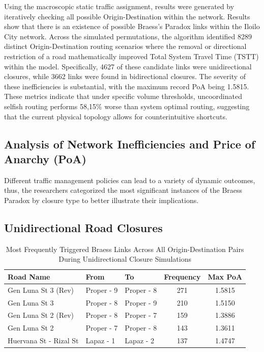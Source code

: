 Using the macroscopic static traffic assignment, results were generated by iteratively checking all possible Origin-Destination within the network. Results show that there is an existence of possible Braess's Paradox links within the Iloilo City network. Across the simulated permutations, the algorithm identified 8289 distinct Origin-Destination routing scenarios where the removal or directional restriction of a road mathematically improved Total System Travel Time (TSTT) within the model. Specifically, 4627 of these candidate links were unidirectional closures, while 3662 links were found in bidirectional closures. The severity of these inefficiencies is substantial, with the maximum record PoA being 1.5815. These metrics indicate that under specific volume thresholds, uncoordinated selfish routing performs 58,15\% worse than system optimal routing, suggesting that the current physical topology allows for counterintuitive shortcuts.

\subsection{Analysis of Network Inefficiencies and Price of Anarchy (PoA)}
\label{sec:network_inefficiencies_PoA}

Different traffic management policies can lead to a variety of dynamic outcomes, thus, the researchers categorized the most significant instances of the Braess Paradox by closure type to better illustrate their implications.

\subsection{Unidirectional Road Closures}
\label{sec:unidirectional_closures}


\begin{table}[H]
    \centering
    \renewcommand{\thetable}{5.1a}

    \begin{tabular}{|l|l|l|c|c|}
    \hline
    \textbf{Road Name} & \textbf{From} & \textbf{To} & \textbf{Frequency} & \textbf{Max PoA} \\ \hline
    Gen Luna St 3 (Rev) & Proper - 9 & Proper - 8 & 271 & 1.5815 \\ \hline
    Gen Luna St 3 & Proper - 8 & Proper - 9 & 210 & 1.5150 \\ \hline
    Gen Luna St 2 (Rev) & Proper - 8 & Proper - 7 & 159 & 1.3886 \\ \hline
    Gen Luna St 2 & Proper - 7 & Proper - 8 & 143 & 1.3611 \\ \hline
    Huervana St - Rizal St & Lapaz - 1 & Lapaz - 2 & 137 & 1.4747 \\ \hline
    \end{tabular}
    \caption{Most Frequently Triggered Braess Links Across All Origin-Destination Pairs During Unidirectional Closure Simulations}
    \label{tab:5.1a}
\end{table}

